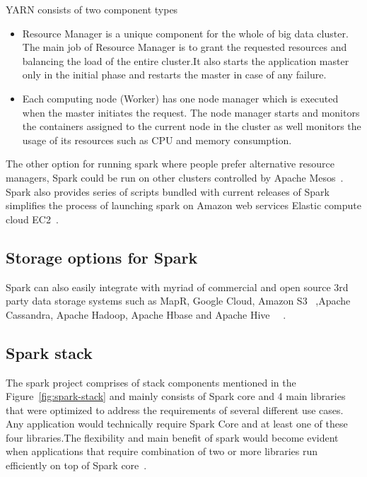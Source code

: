 YARN consists of two component types

\begin{itemize}

\item Resource Manager is a unique component for the whole of big data cluster. The 
main job of Resource Manager is to grant the requested resources and balancing 
the load of the entire cluster.It also starts the application master only in 
the initial phase and restarts the master in case of any failure.

\item Each computing node (Worker) has one node manager  which is executed when the 
master initiates the request. The node manager starts and monitors the 
containers assigned to the current node in the cluster as well monitors the 
usage of its resources such as CPU and memory consumption.

\end{itemize}

The other option for running spark where people prefer alternative resource 
managers, Spark could be run on other clusters controlled by Apache Mesos~\cite{hid-sp18-410-mesos}.
Spark also provides series of scripts bundled with current releases of Spark 
simplifies the process of launching spark on Amazon web services Elastic 
compute cloud EC2~\cite{hid-sp18-410-spark-architecture}.

\subsection{Storage options for Spark}

Spark can also easily integrate with myriad of commercial and open source 3rd 
party data storage systems such as MapR, Google Cloud, Amazon S3~\cite{hid-sp18-410-s3}
,Apache Cassandra, Apache Hadoop, Apache Hbase and Apache Hive~\cite{hid-sp18-410-hive}
~\cite{hid-sp18-410-spark-architecture}.


\subsection{Spark stack}


The spark project comprises of stack components mentioned in the 
Figure~\ref{fig:spark-stack} and mainly consists of Spark core and 
4 main libraries that were optimized to address the requirements 
of several different use cases.
Any application would technically require Spark Core and at least one of these 
four libraries.The flexibility and main benefit of spark would become evident 
when applications that require combination of two or more libraries run 
efficiently on top of Spark core~\cite{hid-sp18-410-spark-architecture}.


